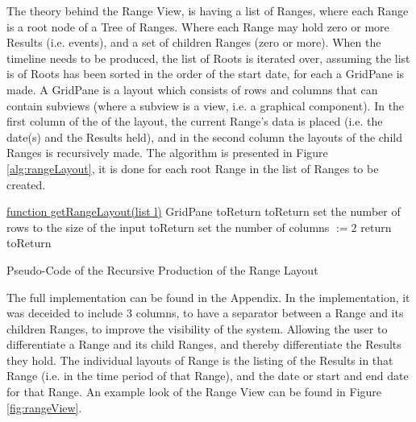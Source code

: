 \par The theory behind the Range View, is having a list of Ranges, where each Range is a root node of a Tree of Ranges. Where each Range may hold zero or more Results (i.e. events), and a set of children Ranges (zero or more). When the timeline needs to be produced, the list of Roots is iterated over, assuming the list is of Roots has been sorted in the order of the start date, for each a GridPane is made. A GridPane is a layout which consists of rows and columns that can contain subviews (where a subview is a view, i.e. a graphical component). In the first column of the of the layout, the current Range's data is placed (i.e. the date(s) and the Results held), and in the second column the layouts of the child Ranges is recursively made. The algorithm is presented in Figure \ref{alg:rangeLayout}, it is done for each root Range in the list of Ranges to be created.
\begin{algorithm}[H]
\underline{function getRangeLayout(list l)}\;
GridPane toReturn\;
toReturn set the number of rows to the size of the input\;
toReturn set the number of columns $:= 2$\;
return toReturn\;
\caption{Pseudo-Code of the Recursive Production of the Range Layout}
\label{alg:rangeLayout}
\end{algorithm}
\par The full implementation can be found in the Appendix. In the implementation, it was deceided to include 3 columns, to have a separator between a Range and its children Ranges, to improve the visibility of the system. Allowing the user to differentiate a Range and its child Ranges, and thereby differentiate the Results they hold. The individual layouts of Range is the listing of the Results in that Range (i.e. in the time period of that Range), and the date or start and end date for that Range. An example look of the Range View can be found in Figure \ref{fig:rangeView}.
